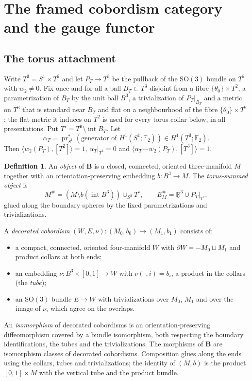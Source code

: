 \documentclass[11pt]{amsart}
\theoremstyle{definition}
\newtheorem{definition}[theorem]{Definition}
\theoremstyle{remark}
\theoremstyle{plain}
\numberwithin{equation}{section}
\newcommand{\RR}{\mathbb{R}}
\newcommand{\FF}{\mathbb{F}_2}
\newcommand{\bB}{\mathbf{B}}
\newcommand{\SO}{\mathrm{SO}}
\begin{document}
\section{The framed cobordism category and the gauge functor}\label{sec:category}

\subsection{The torus attachment}

Write $T^3=S^1\times T^2$ and let $P_T\to T^3$ be the pullback of the
$\SO(3)$ bundle on $T^2$ with $w_2\ne0$. Fix once and for all a ball
$B_T\subset T^3$ disjoint from a fibre $\{\theta_0\}\times T^2$, a
parametrization of $B_T$ by the unit ball $B^3$, a trivialization of
$P_T|_{B_T}$ and a metric on $T^3$ that is standard near $B_T$ and flat on a
neighbourhood of the fibre $\{\theta_0\}\times T^2$; the flat metric it induces
on $T^2$ is used for every torus collar below, in all presentations. Put
$T^\circ=T^3\setminus\operatorname{int}B_T$. Let
\begin{equation}\label{eq:alphaT}
\alpha_T=\operatorname{pr}_{S^1}^*(\text{generator of }H^1(S^1;\FF))
\in H^1(T^3;\FF).
\end{equation}
Then $\langle w_2(P_T),[T^2]\rangle=1$, $\alpha_T|_{T^2}=0$ and
$\langle\alpha_T\smile w_2(P_T),[T^3]\rangle=1$.

\begin{definition}\label{def:category}
An \emph{object} of $\bB$ is a closed, connected, oriented three-manifold
$M$ together with an orientation-preserving embedding $b\colon B^3\to M$.
The \emph{torus-summed object} is
\[
M^\#=(M\setminus b(\operatorname{int}B^3))\cup_{S^2}T^\circ,
\qquad
E_M^\#=\underline{\RR}^3\cup P_T|_{T^\circ},
\]
glued along the boundary spheres by the fixed parametrizations and
trivializations.

A \emph{decorated cobordism} $(W,E,\nu)\colon(M_0,b_0)\to(M_1,b_1)$
consists of:
\begin{itemize}[leftmargin=2em]
\item a compact, connected, oriented four-manifold $W$ with
  $\partial W=-M_0\sqcup M_1$ and product collars at both ends;
\item an embedding $\nu\colon B^3\times[0,1]\to W$ with
  $\nu(\cdot,i)=b_i$, a product in the collars (the \emph{tube});
\item an $\SO(3)$ bundle $E\to W$ with trivializations over $M_0$,
  $M_1$ and over the image of $\nu$, which agree on the overlaps.
\end{itemize}
An \emph{isomorphism} of decorated cobordisms is an
orientation-preserving diffeomorphism covered by a bundle isomorphism,
both respecting the boundary identifications, the tubes and the
trivializations. The morphisms of $\bB$ are isomorphism classes of
decorated cobordisms. Composition glues along the ends using the
collars, tubes and trivializations; the identity of $(M,b)$ is the
product $[0,1]\times M$ with the vertical tube and the product bundle.
\end{definition}
\end{document}
